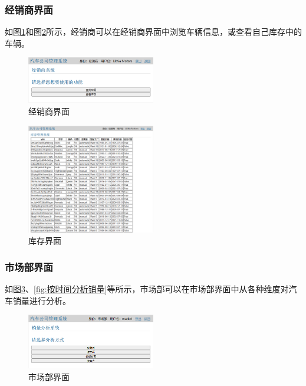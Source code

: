 \documentclass[hyperref,a4paper,UTF8]{ctexart}
\begin{document}
\subsubsection{经销商界面}

如图\ref{fig:经销商界面}和图\ref{fig:库存界面}所示，经销商可以在经销商界面中浏览车辆信息，或查看自己库存中的车辆。

\begin{figure}[h]
    \centering
    \includegraphics[width=0.5\textwidth]{figures/经销商界面.png}
    \caption{经销商界面}
    \label{fig:经销商界面}
\end{figure}

\begin{figure}[h]
    \centering
    \includegraphics[width=0.5\textwidth]{figures/库存界面.png}
    \caption{库存界面}
    \label{fig:库存界面}
\end{figure}

\subsubsection{市场部界面}

如图\ref{fig:市场部界面}、\ref{fig:按时间分析销量}等所示，市场部可以在市场部界面中从各种维度对汽车销量进行分析。

\begin{figure}[h]
    \centering
    \includegraphics[width=0.5\textwidth]{figures/市场部界面.png}
    \caption{市场部界面}
    \label{fig:市场部界面}
\end{figure}
\end{document}
